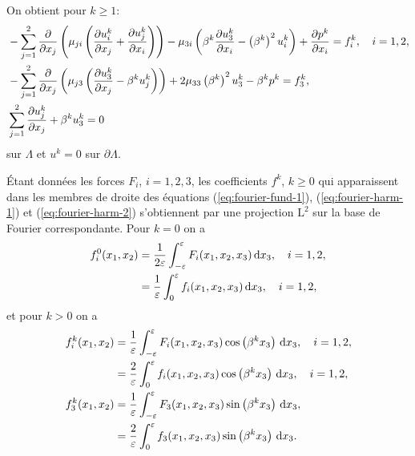 On obtient pour $k
\geq 1$:
\begin{align}
  &-\sum_{j = 1}^2\frac{\partial}{\partial
    x_j}\left( \mu_{ji}\left( \frac{\partial u_i^k}{\partial x_j} +
      \frac{\partial u_j^k}{\partial x_i} \right) \right) -
  \mu_{3i}\left( \beta^k\frac{\partial u_3^k}{\partial x_i} -
    \left( \beta^k \right)^2 u_i^k \right) + \frac{\partial p^k}{\partial x_i} = f_i^k,\quad
  i = 1,2,\label{eq:fourier-harm-1}\\
  &-\sum_{j = 1}^2\frac{\partial}{\partial
    x_j}\left( \mu_{j3}\left( \frac{\partial u_3^k}{\partial x_j} -
      \beta^k u_j^k \right) \right) + 2\mu_{33}\left( \beta^k \right)^2 u_3^k - \beta^k p^k =
  f_3^k,\label{eq:fourier-harm-2}\\
  &\sum_{j = 1}^2\frac{\partial u_j^k}{\partial x_j} + \beta^k u_3^k = 0\label{eq:fourier-harm-3}
\end{align}
sur $\Lambda$ et $u^k = 0$ sur $\partial \Lambda$.

Étant données les forces $F_i$, $i = 1,2,3$, les coefficients $f^k$,
$k \geq 0$ qui apparaissent dans les membres de droite des équations
(\ref{eq:fourier-fund-1}), (\ref{eq:fourier-harm-1}) et
(\ref{eq:fourier-harm-2}) s'obtiennent par une projection $\mathrm
L^2$ sur la base de Fourier correspondante. Pour $k = 0$ on a
\begin{align}
  f_i^0(x_1, x_2) &=
  \frac{1}{2\varepsilon}\int_{-\varepsilon}^{\varepsilon}F_i(x_1, x_2, x_3)\,\mathrm
  dx_3, \quad i = 1,2,\nonumber\\
  &= \frac{1}{\varepsilon}\int_{0}^{\varepsilon}f_i(x_1, x_2, x_3)\,\mathrm
  dx_3, \quad i = 1,2,\label{eq:f-1}
\end{align}
et pour $k > 0$ on a
\begin{align}
f_i^k(x_1, x_2) &=
\frac{1}{\varepsilon}\int_{-\varepsilon}^{\varepsilon}F_i(x_1, x_2,
x_3)\cos\left( \beta^k x_3 \right)\,\mathrm dx_3,\quad i =
1,2,\\
&=
\frac{2}{\varepsilon}\int_{0}^{\varepsilon}f_i(x_1, x_2,
x_3)\cos\left( \beta^k x_3 \right)\,\mathrm dx_3,\quad i =
1,2,\label{eq:f-2}\\
f_3^k(x_1, x_2) &= \frac{1}{\varepsilon}\int_{-\varepsilon}^{\varepsilon}
F_3(x_1, x_2,x_3) \sin\left( \beta^k x_3 \right)\,\mathrm
dx_3,\\
&= \frac{2}{\varepsilon}\int_{0}^{\varepsilon}
f_3(x_1, x_2,x_3) \sin\left( \beta^k x_3 \right)\,\mathrm
dx_3.\label{eq:f-3}
\end{align}


